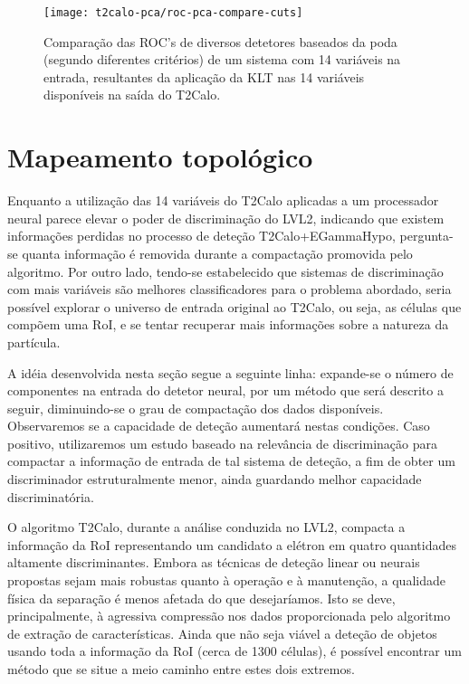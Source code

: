 \begin{figure}
\begin{center}
\texttt{[image: t2calo-pca/roc-pca-compare-cuts]}
\end{center}
\caption{Comparação das ROC's de diversos detetores baseados da poda (segundo
diferentes critérios) de um sistema com 14 variáveis na entrada, resultantes
da aplicação da KLT nas 14 variáveis disponíveis na saída do T2Calo.}
\label{fig:roc-pca-compare-cuts}
\end{figure}

\section{Mapeamento topológico}

Enquanto a utilização das 14 variáveis do T2Calo aplicadas a um processador
neural parece elevar o poder de discriminação do LVL2, indicando que existem
informações perdidas no processo de deteção T2Calo+EGammaHypo, pergunta-se
quanta informação é removida durante a compactação promovida pelo
algoritmo. Por outro lado, tendo-se estabelecido que sistemas de discriminação
com mais variáveis são melhores classificadores para o problema abordado,
seria possível explorar o universo de entrada original ao T2Calo, ou seja, as
células que compõem uma RoI, e se tentar recuperar mais informações sobre a
natureza da partícula.

A idéia desenvolvida nesta seção segue a seguinte linha: expande-se o número
de componentes na entrada do detetor neural, por um método que será descrito a
seguir, diminuindo-se o grau de compactação dos dados
disponíveis. Observaremos se a capacidade de deteção aumentará nestas
condições. Caso positivo, utilizaremos um estudo baseado na relevância de 
discriminação para compactar a informação de entrada de tal sistema de
deteção, a fim de obter um discriminador estruturalmente menor, ainda
guardando melhor capacidade discriminatória.

O algoritmo T2Calo, durante a análise conduzida no LVL2, compacta a informação
da RoI representando um candidato a elétron em quatro quantidades altamente
discriminantes. Embora as técnicas de deteção linear ou neurais propostas
sejam mais robustas quanto à operação e à manutenção, a qualidade física da
separação é menos afetada do que desejaríamos. Isto se deve, principalmente, à
agressiva compressão nos dados proporcionada pelo algoritmo de extração de
características. Ainda que não seja viável a deteção de objetos usando toda a
informação da RoI (cerca de 1300 células), é possível encontrar um método que
se situe a meio caminho entre estes dois extremos.

